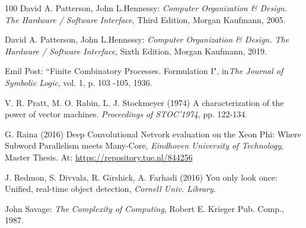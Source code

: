 \begin{thebibliography}{100}
 David A. Patterson, John L.Hennessy: {\em Computer Organization \& Design. The Hardware / Software Interface}, Third Edition, Morgan Kaufmann, 2005.

 David A. Patterson, John L.Hennessy: {\em Computer Organization \& Design. The Hardware / Software Interface}, Sixth Edition, Morgan Kaufmann, 2019.



 Emil Post: ``Finite Combinatory Processes.
 Formulation I", in{\em The Journal of Symbolic Logic}, vol. 1, p. 103 -105, 1936.

   V. R. Pratt, M. O. Rabin, L. J. Stockmeyer (1974)  A characterization of the power of vector machines. {\em Proceedings of STOC’1974}, pp. 122-134.

   G. Raina (2016) Deep Convolutional Netvork evaluation on the Xeon Phi: Where Subword Parallelism meets Many-Core, {\em Eindhoven University of Technology}, Master Thesis. At:  \url{https://repository.tue.nl/844256}

      J. Redmon,  S. Divvala,  R. Girshick, A.   Farhadi (2016) You only look once: Unified, real-time object detection,  {\em Cornell Univ. Library}.





 John Savage: {\em The Complexity of Computing}, Robert E. Krieger Pub. Comp., 1987.


\end{thebibliography}
